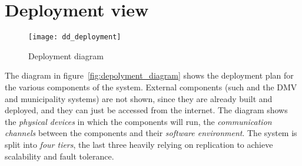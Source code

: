 \section{Deployment view}
\label{sec:deployment_view}
\begin{figure}[ht]
    \centering
    \texttt{[image: dd\_deployment]}
    \caption{Deployment diagram}
    \label{fig:depolyment_diagram}
\end{figure}

The diagram in figure~\vref{fig:depolyment_diagram} shows the deployment plan
for the various components of the system. External components (such and the DMV
and municipality systems) are not shown, since they are already built and
deployed, and they can just be accessed from the internet.
The diagram shows the \emph{physical devices} in which the components will run,
the \emph{communication channels} between the components and their
\emph{software environment}.
The system is split into \emph{four tiers}, the last three heavily relying on
replication to achieve scalability and fault tolerance.

